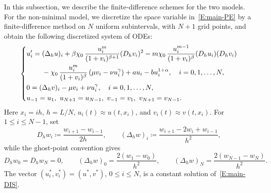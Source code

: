 \documentclass[11pt]{article} %
\theoremstyle{remark}
\theoremstyle{remark}
\numberwithin{equation}{section}
\numberwithin{figure}{section}
\numberwithin{table}{section}
\begin{document}
In this subsection, we describe the finite-difference schemes for the two
models. For the non-minimal model, we discretize the space variable
in~\eqref{E:main-PE} by a finite-difference method on $N$ uniform subintervals,
with $N + 1$ grid points, and obtain the following discretized system of ODEs:
\begin{align}\label{E:main-DIS}
  \begin{dcases}
    u_i'
    = (\Delta_h u)_i
    + \beta\chi_0\,\dfrac{u_i^m}{(1+v_i)^{\beta+1}} (D_h v_i)^2
    - m\chi_0\,\dfrac{u_i^{m-1}}{(1+v_i)^\beta} (D_h u_i)(D_h v_i)\cr
    \hphantom{\dot{u}_i = {}}
    - \chi_0\,\dfrac{u_i^m}{(1+v_i)^\beta}
    \left(\mu v_i-\nu u_i^\gamma\right)
    + au_i - b u_i^{1+\alpha},
    \quad i=0,1,\ldots,N,\cr
    0 = (\Delta_h v)_i - \mu v_i + \nu u_i^\gamma,
    \quad i=0,1,\ldots,N,\cr
    u_{-1}=u_1,\ u_{N+1}=u_{N-1},\
    v_{-1}=v_1,\ v_{N+1}=v_{N-1}.
  \end{dcases}
\end{align}
Here $x_i = ih$, $h = L/N$, $u_i(t)\approx u(t, x_i)$, and $v_i(t)\approx v(t,
x_i)$. For $1 \le i \le N - 1$, set
\[
  D_h w_i \coloneqq \frac{w_{i+1}-w_{i-1}}{2h},
  \qquad
  (\Delta_h w)_i \coloneqq \frac{w_{i+1}-2w_i+w_{i-1}}{h^2},
\]
while the ghost-point convention gives
\[
  D_h w_0 = D_h w_N = 0,
  \qquad
  (\Delta_h w)_0 = \frac{2(w_1-w_0)}{h^2},
  \qquad
  (\Delta_h w)_N = \frac{2(w_{N-1}-w_N)}{h^2}.
\]
The vector $(u_i^*,v_i^*) = (u^*,v^*)$, $0 \le i \le N$, is a constant solution
of~\eqref{E:main-DIS}.
\end{document}
